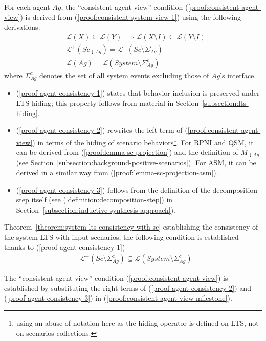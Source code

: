 For each agent $Ag$, the ``consistent agent view'' condition (\ref{proof:consistent-agent-view}) is derived from (\ref{proof:consistent-system-view-1}) using the following derivations:
\begin{align}
&\mathcal{L}(X) \subseteq \mathcal{L}(Y) \implies \mathcal{L}(X \setminus I) \subseteq \mathcal{L}(Y \setminus I) \label{proof-agent-consistency-1}\\
&\mathcal{L}^+(Sc_{\downarrow Ag}) = \mathcal{L}^+(Sc \setminus \Sigma_{Ag}^c)\label{proof-agent-consistency-2}\\
&\mathcal{L}(Ag) = \mathcal{L}(System \setminus \Sigma_{Ag}^c)\label{proof-agent-consistency-3}
\end{align}
where $\Sigma_{Ag}^c$ denotes the set of all system events excluding those of $Ag$'s interface.
\begin{itemize}
\item (\ref{proof-agent-consistency-1}) states that behavior inclusion is preserved under LTS hiding; this property follows from material in Section~\ref{subsection:lts-hiding}. 
\item (\ref{proof-agent-consistency-2}) rewrites the left term of (\ref{proof:consistent-agent-view}) in terms of the hiding of scenario behaviors\footnote{using an abuse of notation here as the hiding operator is defined on LTS, not on scenarios collections.}. For RPNI and QSM, it can be derived from (\ref{proof:lemma-sc-projection}) and the definition of $M_{\downarrow Ag}$ (see Section~\ref{subsection:background-positive-scenarios}). For ASM, it can be derived in a similar way from (\ref{proof:lemma-sc-projection-asm}).
\item (\ref{proof-agent-consistency-3}) follows from the definition of the decomposition step itself (see (\ref{definition:decomposition-step}) in Section~\ref{subsection:inductive-synthesis-approach}). 
\end{itemize}

Theorem~\ref{theorem:system-lts-consistency-with-sc} establishing the consistency of the system LTS with input scenarios, the following condition is established thanks to (\ref{proof-agent-consistency-1})
\begin{align}
&\mathcal{L}^+(Sc \setminus \Sigma_{Ag}^c) \subseteq \mathcal{L}(System \setminus \Sigma_{Ag}^c)\label{proof:consistent-agent-view-milestone}
\end{align}

The ``consistent agent view'' condition (\ref{proof:consistent-agent-view}) is established by substituting the right terms of (\ref{proof-agent-consistency-2}) and (\ref{proof-agent-consistency-3}) in (\ref{proof:consistent-agent-view-milestone}).

